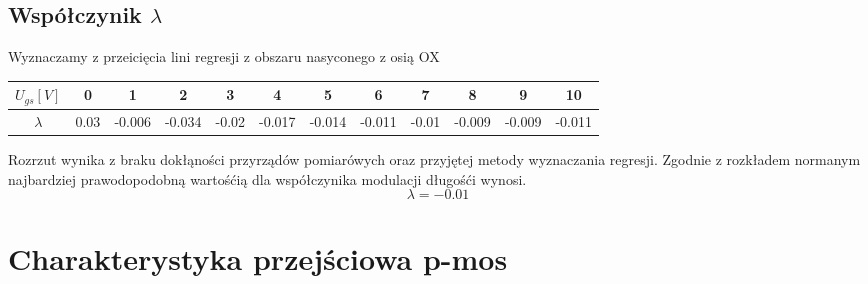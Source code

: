 \documentclass[11pt]{article}
\begin{document}
\subsection{Współczynik $\lambda$}
Wyznaczamy z przeicięcia lini regresji z obszaru nasyconego z osią OX
\bigskip

\begin{tabular}{|c|c|c|c|c|c|c|c|c|c|c|c|}
\hline
$U_{gs}[V]$ & 0 & 1 & 2 & 3 & 4 & 5 & 6 & 7 & 8 & 9 & 10 \\
\hline
$\lambda$ & 0.03&-0.006&-0.034&-0.02&-0.017&-0.014&-0.011&-0.01&-0.009&-0.009&-0.011 \\
\hline
\end{tabular}

\bigskip
Rozrzut wynika z braku dokłąności przyrządów pomiarówych oraz przyjętej metody wyznaczania regresji. Zgodnie z rozkładem normanym najbardziej prawodopodobną wartośćią dla współczynika modulacji długośći wynosi.
$$ \lambda = -0.01$$

\section{Charakterystyka przejściowa p-mos}
\end{document}
